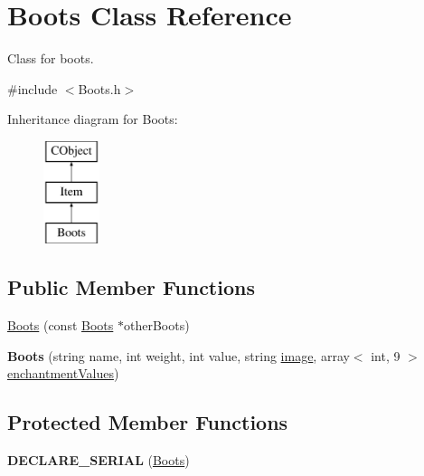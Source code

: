 \hypertarget{class_boots}{}\section{Boots Class Reference}
\label{class_boots}


Class for boots.  




{\ttfamily \#include $<$Boots.\+h$>$}

Inheritance diagram for Boots\+:\begin{figure}[H]
\begin{center}
\leavevmode
\includegraphics[height=3.000000cm]{class_boots}
\end{center}
\end{figure}
\subsection*{Public Member Functions}
\begin{DoxyCompactItemize}
\item 
\hyperlink{class_boots_ad3452c78ef60ba4d955e779560d5e5ba}{Boots} (const \hyperlink{class_boots}{Boots} $\ast$other\+Boots)
\item 
\hypertarget{class_boots_adbbf30b0b77d0124262315aeb01647a2}{}\label{class_boots_adbbf30b0b77d0124262315aeb01647a2} 
{\bfseries Boots} (string name, int weight, int value, string \hyperlink{class_item_add84a42b692ee5d580a92ae4a922f784}{image}, array$<$ int, 9 $>$ \hyperlink{class_item_a8532d8729f9433f41b7fc18b20d83236}{enchantment\+Values})
\end{DoxyCompactItemize}
\subsection*{Protected Member Functions}
\begin{DoxyCompactItemize}
\item 
\hypertarget{class_boots_a067d801af4bd7abb26c9f11970246ed8}{}\label{class_boots_a067d801af4bd7abb26c9f11970246ed8} 
{\bfseries D\+E\+C\+L\+A\+R\+E\+\_\+\+S\+E\+R\+I\+AL} (\hyperlink{class_boots}{Boots})
\end{DoxyCompactItemize}

